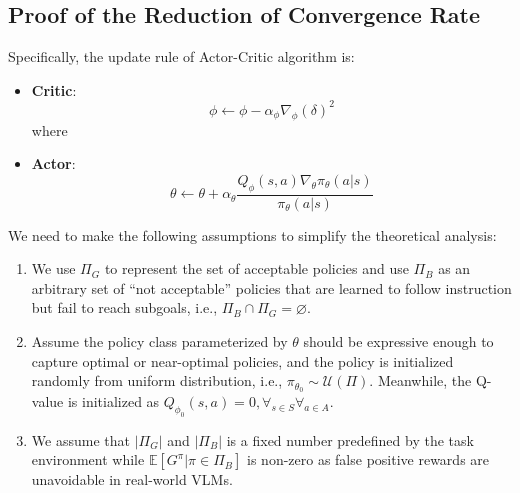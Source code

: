 \documentclass{article}
\theoremstyle{plain}
\theoremstyle{definition}
\theoremstyle{remark}
\begin{document}
\subsection{Proof of the Reduction of Convergence Rate}
\label{sec:proofofreductionofconvergence}

Specifically, the update rule of Actor-Critic algorithm is: 

\begin{itemize}
    \item \textbf{Critic}: 
    \begin{equation}
        \phi \leftarrow \phi - \alpha_\phi \nabla_\phi (\delta)^2
    \end{equation}
    where 
    \item \textbf{Actor}: 
    \begin{equation}
        \theta \leftarrow \theta + \alpha_\theta \frac{Q_\phi(s,a) \nabla_\theta \pi_\theta(a|s)} {\pi_\theta(a|s)}
    \end{equation}
\end{itemize}

We need to make the following assumptions to simplify the theoretical analysis: 

\begin{enumerate}
    \item We use $\Pi_G$ to represent the set of acceptable policies and use $\Pi_B$ as an arbitrary set of ``not acceptable'' policies that are learned to follow instruction but fail to reach subgoals, i.e., $\Pi_{B} \cap \Pi_{G} = \varnothing$.

    \item Assume the policy class parameterized by $\theta$ should be expressive enough to capture optimal or near-optimal policies, and the policy is initialized randomly from uniform distribution, i.e., $\pi_{\theta_{0}} \sim \mathcal U(\Pi)$. Meanwhile, the Q-value is initialized as $Q_{\phi_{0}}(s, a) = 0, \forall_{s\in S} \forall_{a\in A}$.

    \item We assume that $|\Pi_{G}|$ and $|\Pi_B|$ is a fixed number predefined by the task environment while $\mathbb E[G^\pi| \pi \in \Pi_{B}]$ is non-zero as false positive rewards are unavoidable in real-world VLMs.
\end{enumerate}
\end{document}
